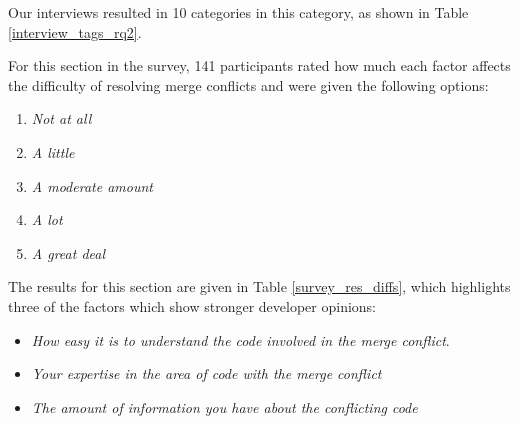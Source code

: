 Our interviews resulted in 10 categories in this category, as shown in Table \ref{interview_tags_rq2}.

For this section in the survey, 141 participants rated how much each factor affects the difficulty of resolving merge conflicts and were given the following options:

\begin{enumerate}
	\item \textit{Not at all}
	\item \textit{A little}
	\item \textit{A moderate amount}
	\item \textit{A lot}
	\item \textit{A great deal}
\end{enumerate}
The results for this section are given in Table \ref{survey_res_diffs}, which highlights three of the factors which show stronger developer opinions:
\begin{itemize}
\item \textit{How easy it is to understand the code involved in the merge conflict}. 
\item \textit{Your expertise in the area of code with the merge conflict}
\item \textit{The amount of information you have about the conflicting code} 
\end{itemize} 

